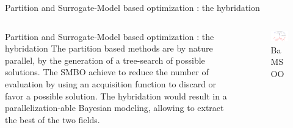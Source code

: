 \begin{frame}{Partition and Surrogate-Model based optimization : the hybridation}

    \begin{columns}
        \begin{column}{0.5\textwidth}
            \begin{block}{Partition and Surrogate-Model based optimization : the hybridation}
        The partition based methods are by nature parallel, by the generation of a tree-search of possible solutions. The SMBO achieve to reduce the number of evaluation by using an acquisition function to discard or favor a possible solution. The hybridation would result in a parallelization-able Bayesian modeling, allowing to extract the best of the two fields. \\
            \end{block}
        \end{column}

        \begin{column}{0.5\textwidth}
            \begin{figure}
                \centering
                \includegraphics[width=\linewidth]{imgs/bamsoo.png}
                \caption{BaMSOO}
            \end{figure}
        \end{column}
    \end{columns}

\end{frame}



